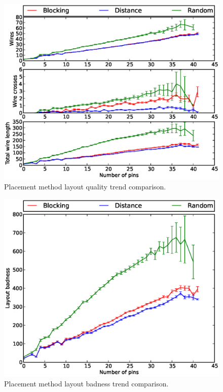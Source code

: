 \begin{figure}
\begin{center}
\includegraphics[width=\textwidth]{Images/placement_quality_trend_comparison.eps}
\caption[Placement method layout quality trend comparison]{Placement method
layout quality trend comparison.}
\label{fig:placement_quality_trend}
\end{center}
\end{figure}

\begin{figure}
\begin{center}
\includegraphics[width=\textwidth]{Images/placement_badness_trend_comparison.eps}
\caption[Placement method layout badness trend comparison]{Placement method
layout badness trend comparison.}
\label{fig:placement_badness_trend}
\end{center}
\end{figure}

